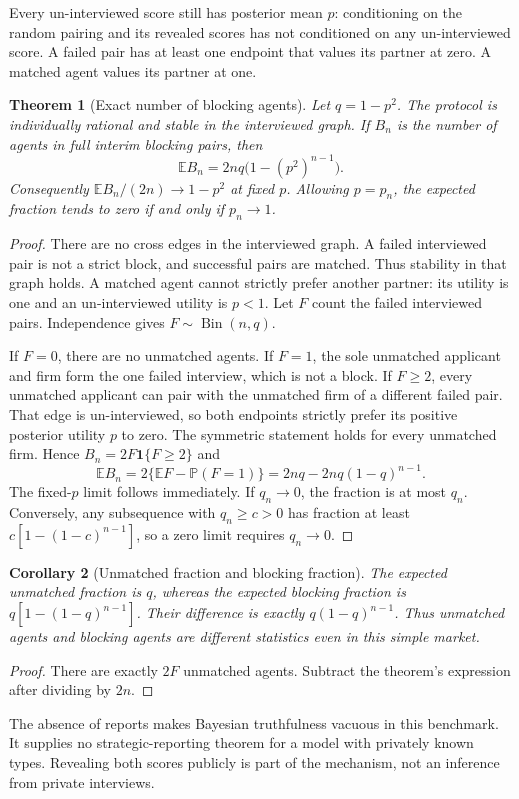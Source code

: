 \documentclass[11pt,a4paper]{article}
\newtheorem{theorem}{Theorem}[section]
\newtheorem{corollary}[theorem]{Corollary}
\theoremstyle{definition}
\theoremstyle{remark}
\newcommand{\E}{\mathbb{E}}
\newcommand{\Prob}{\mathbb{P}}
\newcommand{\ind}{\mathbf{1}}
\begin{document}
Every un-interviewed score still has posterior mean $p$: conditioning on the random pairing and its revealed scores has not conditioned on any un-interviewed score. A failed pair has at least one endpoint that values its partner at zero. A matched agent values its partner at one.
\begin{theorem}[Exact number of blocking agents]
Let $q=1-p^2$. The protocol is individually rational and stable in the interviewed graph. If $B_n$ is the number of agents in full interim blocking pairs, then
\[
 \E B_n=2nq\bigl(1-(p^2)^{n-1}\bigr).
\]
Consequently $\E B_n/(2n)\to1-p^2$ at fixed $p$. Allowing $p=p_n$, the expected fraction tends to zero if and only if $p_n\to1$.
\end{theorem}
\begin{proof}
There are no cross edges in the interviewed graph. A failed interviewed pair is not a strict block, and successful pairs are matched. Thus stability in that graph holds. A matched agent cannot strictly prefer another partner: its utility is one and an un-interviewed utility is $p<1$. Let $F$ count the failed interviewed pairs. Independence gives $F\sim\operatorname{Bin}(n,q)$.

If $F=0$, there are no unmatched agents. If $F=1$, the sole unmatched applicant and firm form the one failed interview, which is not a block. If $F\ge2$, every unmatched applicant can pair with the unmatched firm of a different failed pair. That edge is un-interviewed, so both endpoints strictly prefer its positive posterior utility $p$ to zero. The symmetric statement holds for every unmatched firm. Hence
$B_n=2F\ind\{F\ge2\}$ and
\[
 \E B_n=2\{\E F-\Prob(F=1)\}
 =2nq-2nq(1-q)^{n-1}.
\]
The fixed-$p$ limit follows immediately. If $q_n\to0$, the fraction is at most $q_n$. Conversely, any subsequence with $q_n\ge c>0$ has fraction at least $c[1-(1-c)^{n-1}]$, so a zero limit requires $q_n\to0$.
\end{proof}
\begin{corollary}[Unmatched fraction and blocking fraction]
The expected unmatched fraction is $q$, whereas the expected blocking fraction is $q[1-(1-q)^{n-1}]$. Their difference is exactly $q(1-q)^{n-1}$. Thus unmatched agents and blocking agents are different statistics even in this simple market.
\end{corollary}
\begin{proof}
There are exactly $2F$ unmatched agents. Subtract the theorem's expression after dividing by $2n$.
\end{proof}
The absence of reports makes Bayesian truthfulness vacuous in this benchmark. It supplies no strategic-reporting theorem for a model with privately known types. Revealing both scores publicly is part of the mechanism, not an inference from private interviews.
\end{document}
